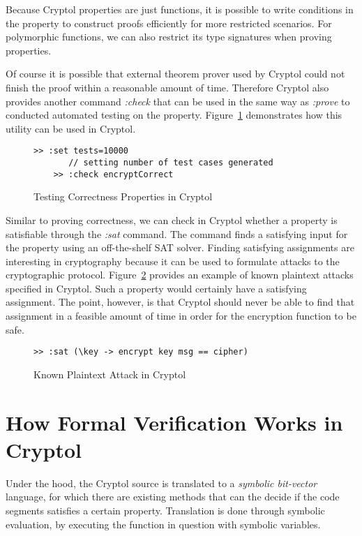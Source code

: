 \documentclass[a4paper, notitlepage]{report}
\begin{document}
Because Cryptol properties are just functions, it is possible to write conditions
in the property to construct proofs efficiently for more restricted scenarios.
For polymorphic functions, we can also restrict its type signatures when
proving properties.

Of course it is possible that external theorem prover used by Cryptol could
not finish the proof within a reasonable amount of time. Therefore Cryptol
also provides another command \emph{:check} that can be used in the same way
as \emph{:prove} to conducted automated testing on the property. Figure~\ref{fig:test}
demonstrates how this utility can be used in Cryptol.

\begin{figure}
  \begin{lstlisting}[frame=single]
    >> :set tests=10000
       // setting number of test cases generated 
    >> :check encryptCorrect
  \end{lstlisting}
  \caption{Testing Correctness Properties in Cryptol}
  \label{fig:test}
\end{figure}

Similar to proving correctness, we can check in Cryptol whether a property is
satisfiable through the \emph{:sat} command. The command finds a satisfying input
for the property using an off-the-shelf SAT solver. 
Finding satisfying assignments are interesting in cryptography because it can
be used to formulate attacks to the cryptographic protocol. Figure~\ref{fig:sat}
provides an example of known plaintext attacks specified in Cryptol.
Such a property would certainly have a satisfying assignment. The point, however,
is that Cryptol should never be able to find that assignment in a feasible amount
of time in order for the encryption function to be safe.

\begin{figure}
  \begin{lstlisting}[frame=single]
    >> :sat (\key -> encrypt key msg == cipher)
  \end{lstlisting}
  \caption{Known Plaintext Attack in Cryptol}
  \label{fig:sat}
\end{figure}

\section{How Formal Verification Works in Cryptol}

Under the hood, the Cryptol source is translated to a \emph{symbolic bit-vector} language,
for which there are existing methods that can the decide if the code segments satisfies
a certain property. Translation is done through symbolic evaluation,
by executing the function in question with symbolic variables.
\end{document}
